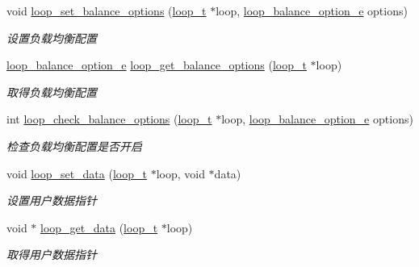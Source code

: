 \begin{DoxyCompactItemize}
void \hyperlink{a00068_a20964027b5a498c7f206d6a04568fa11_a20964027b5a498c7f206d6a04568fa11}{loop\+\_\+set\+\_\+balance\+\_\+options} (\hyperlink{a00050_a9c3ad1cd2de83e09f3a7b59fa82c94ee_a9c3ad1cd2de83e09f3a7b59fa82c94ee}{loop\+\_\+t} $\ast$loop, \hyperlink{a00050_a6c87150c8f33855c3427c783480fd8ba_a6c87150c8f33855c3427c783480fd8ba}{loop\+\_\+balance\+\_\+option\+\_\+e} options)
\begin{DoxyCompactList}\small\item\em 设置负载均衡配置 \end{DoxyCompactList}\item 
\hyperlink{a00050_a6c87150c8f33855c3427c783480fd8ba_a6c87150c8f33855c3427c783480fd8ba}{loop\+\_\+balance\+\_\+option\+\_\+e} \hyperlink{a00068_a5098c33527e18f4a0bd9bc1856ce17f1_a5098c33527e18f4a0bd9bc1856ce17f1}{loop\+\_\+get\+\_\+balance\+\_\+options} (\hyperlink{a00050_a9c3ad1cd2de83e09f3a7b59fa82c94ee_a9c3ad1cd2de83e09f3a7b59fa82c94ee}{loop\+\_\+t} $\ast$loop)
\begin{DoxyCompactList}\small\item\em 取得负载均衡配置 \end{DoxyCompactList}\item 
int \hyperlink{a00068_aff034d62b761d4ebad97180fb55a4582_aff034d62b761d4ebad97180fb55a4582}{loop\+\_\+check\+\_\+balance\+\_\+options} (\hyperlink{a00050_a9c3ad1cd2de83e09f3a7b59fa82c94ee_a9c3ad1cd2de83e09f3a7b59fa82c94ee}{loop\+\_\+t} $\ast$loop, \hyperlink{a00050_a6c87150c8f33855c3427c783480fd8ba_a6c87150c8f33855c3427c783480fd8ba}{loop\+\_\+balance\+\_\+option\+\_\+e} options)
\begin{DoxyCompactList}\small\item\em 检查负载均衡配置是否开启 \end{DoxyCompactList}\item 
void \hyperlink{a00104_ga480fadf19a49cb27354866e06500a03c_ga480fadf19a49cb27354866e06500a03c}{loop\+\_\+set\+\_\+data} (\hyperlink{a00050_a9c3ad1cd2de83e09f3a7b59fa82c94ee_a9c3ad1cd2de83e09f3a7b59fa82c94ee}{loop\+\_\+t} $\ast$loop, void $\ast$data)
\begin{DoxyCompactList}\small\item\em 设置用户数据指针 \end{DoxyCompactList}\item 
void $\ast$ \hyperlink{a00068_aaec184f54f4ccb89ab5fa003345cd338_aaec184f54f4ccb89ab5fa003345cd338}{loop\+\_\+get\+\_\+data} (\hyperlink{a00050_a9c3ad1cd2de83e09f3a7b59fa82c94ee_a9c3ad1cd2de83e09f3a7b59fa82c94ee}{loop\+\_\+t} $\ast$loop)
\begin{DoxyCompactList}\small\item\em 取得用户数据指针 \end{DoxyCompactList}\item 

\end{DoxyCompactItemize}
